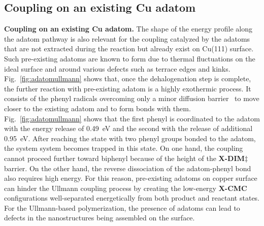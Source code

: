 \documentclass[%
 reprint,
 amsmath,amssymb,
 aps,
prb,
floatfix,
]{revtex4-2}
\newcommand{\lock}{\color{red}}
\newcommand{\lock}{\color{black}}
\newcommand{\comm}{\color{ForestGreen}} %
\begin{document}

\ifdefined\INTERNAL
\subsection{Coupling on an existing Cu adatom}
\fi

{\lock

\textbf{Coupling on an existing Cu adatom.} The shape of the energy profile along the adatom pathway is also relevant for the coupling catalyzed by the adatoms that are not extracted during the reaction but already exist on Cu(111) surface. Such pre-existing adatoms are known to form due to thermal fluctuations on the ideal surface and around various defects such as terrace edges and kinks. Fig.~\ref{fig:adatomullmann} shows that, once the dehalogenation step is complete, the further reaction with pre-existing adatom is a highly exothermic process. It consists of the phenyl radicals overcoming only a minor diffusion barrier~\cite{pccp2010} to move closer to the existing adatom and to form bonds with them. Fig.~\ref{fig:adatomullmann} shows that the first phenyl is coordinated to the adatom with the energy release of \SI{0.49}{\electronvolt} and the second with the release of additional \SI{0.95}{\electronvolt}. After reaching the state with two phenyl groups bonded to the adatom, the system system becomes trapped in this state. On one hand, the  coupling cannot proceed further toward biphenyl because of the height of the \textbf{X-DIM$\ddagger$} barrier. On the other hand, the reverse dissociation of the adatom-phenyl bond also requires high energy. For this reason, pre-existing adatoms on copper surface can hinder the Ullmann coupling process by creating the low-energy \textbf{X-CMC} configurations well-separated energetically from both product and reactant states. For the Ullmann-based polymerization, the presence of adatoms can lead to defects in the nanostructures being assembled on the surface.


}
\end{document}
